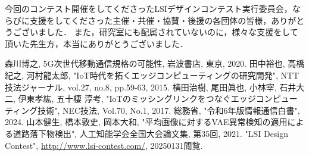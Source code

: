 \documentclass[paper]{ieicej}
\begin{document}
\ack
今回のコンテスト開催をしてくださったLSIデザインコンテスト実行委員会，ならびに支援をしてくださった主催・共催・協賛・後援の各団体の皆様，ありがとうございました．
また，研究室にも配属されていないのに，様々な支援をして頂いた先生方，本当にありがとうございました．
%
%
\begin{thebibliography}{99}%
森川博之, 5G次世代移動通信規格の可能性, 岩波書店, 東京, 2020.
田中裕也, 高橋紀之, 河村龍太郎, "IoT時代を拓くエッジコンピューティングの研究開発", NTT技法ジャーナル, vol.27, no.8, pp.59-63, 2015.
横田治樹, 尾田眞也, 小林宰, 石井大二, 伊東孝紘, 五十棲 淳考, "IoTのミッシングリンクをつなぐエッジコンピューティング技術", NEC技法, Vol.70, No.1, 2017.
総務省, "令和6年版情報通信白書", 2024.
山本健生, 橋本敦史, 岡本大和, "平均画像に対するVAE異常検知の適用による道路落下物検出", 人工知能学会全国大会論文集, 第35回, 2021.
"LSI Design Contest", \url{http://www.lsi-contest.com/}, 20250131閲覧.

\end{thebibliography}
\end{document}
